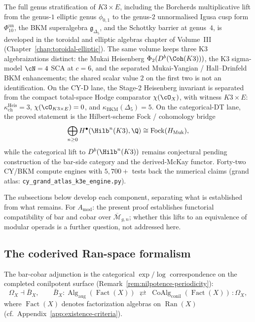 The full genus stratification of $K3 \times E$, including the Borcherds multiplicative lift from the genus-$1$ elliptic genus $\phi_{0,1}$ to the genus-$2$ unnormalised Igusa cusp form $\Phi_{10}^{\mathrm{un}}$, the BKM superalgebra $\mathfrak{g}_{\Delta_5}$, and the Schottky barrier at genus~$4$, is developed in the toroidal and elliptic algebras chapter of Volume~III (Chapter~\ref{chap:toroidal-elliptic}). The same volume keeps three K3 algebraizations distinct: the Mukai Heisenberg $\Phi_2(D^b(\Coh(K3)))$, the K3 sigma-model $\cN = 4$ SCA at $c = 6$, and the separated Mukai-Yangian / Hall--Drinfeld BKM enhancements; the shared scalar value $2$ on the first two is not an identification. On the CY-D lane, the Stage-2 Heisenberg invariant is separated from the compact total-space Hodge comparator $\chi(\cO_X)$, with witness $K3 \times E$: $\kappa_{\mathrm{ch}}^{\mathrm{Heis}} = 3$, $\chi(\cO_{K3 \times E}) = 0$, and $\kappa_{\mathrm{BKM}}(\Delta_5) = 5$. On the categorical-DT lane, the proved statement is the Hilbert-scheme Fock / cohomology bridge
\[
 \bigoplus_{n \ge 0} H^\bullet(\Hilb^n(K3), \Q)
 \cong \operatorname{Fock}(H_{\mathrm{Muk}}),
\]
while the categorical lift to $D^b(\Hilb^n(K3))$ remains conjectural pending construction of the bar-side category and the derived-McKay functor. Forty-two CY/BKM compute engines with $5{,}700{+}$ tests back the numerical claims (grand atlas: \texttt{cy\_grand\_atlas\_k3e\_engine.py}).

\noindent
The subsections below develop each component, separating what is
established from what remains. For $A_{\mathrm{mod}}$: the present
proof establishes functorial compatibility of bar and cobar over
$\overline{\mathcal{M}}_{g,n}$; whether this lifts to an equivalence
of modular operads is a further question, not addressed here.

\medskip

\subsection{The coderived Ran-space formalism}
\label{subsec:coderived-ran}

The bar-cobar adjunction is the categorical $\exp/\log$
correspondence on the completed conilpotent surface
(Remark~\ref{rem:nilpotence-periodicity}):
\[
\Omega_X \dashv \bar{B}_X,\qquad
\bar{B}_X \colon
\operatorname{Alg}_{\mathrm{aug}}(\operatorname{Fact}(X))
\;\rightleftarrows\;
\operatorname{CoAlg}_{\mathrm{conil}}(\operatorname{Fact}(X))
\,:\!\Omega_X,
\]
where $\operatorname{Fact}(X)$ denotes factorization algebras on
$\operatorname{Ran}(X)$ (cf.\ Appendix~\ref{app:existence-criteria}).

